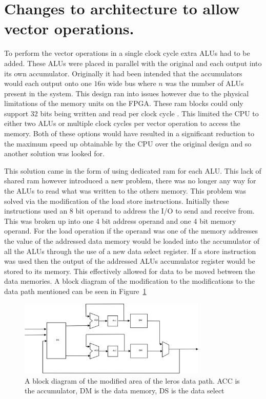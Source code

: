 \section{Changes to architecture to allow vector operations.}

To perform the vector operations in a single clock cycle extra ALUs had to be added. These ALUs were placed in parallel with the original and each output into its own accumulator. Originally it had been intended that the accumulators would each output onto one $16n$ wide bus where $n$ was the number of ALUs present in the system. This design ran into issues however due to the physical limitations of the memory units on the FPGA. These ram blocks could only support 32 bits being written and read per clock cycle \cite{spartan_ram}. This limited the CPU to either two ALUs or multiple clock cycles per vector operation to access the memory. Both of these options would have resulted in a significant reduction to the maximum speed up obtainable by the CPU over the original design and so another solution was looked for.

This solution came in the form of using dedicated ram for each ALU. This lack of shared ram however introduced a new problem, there was no longer any way for the ALUs to read what was written to the others memory. This problem was solved via the modification of the load store instructions. Initially these instructions used an 8 bit operand to address the I/O to send and receive from. This was broken up into one 4 bit address operand and one 4 bit memory operand. For the load operation if the operand was one of the memory addresses the value of the addressed data memory would be loaded into the accumulator of all the ALUs through the use of a new data select register. If a store instruction was used then the output of the addressed ALUs accumulator register would be stored to its memory. This effectively allowed for data to be moved between the data memories. A block diagram of the modification to the modifications to the data path mentioned can be seen in Figure~\ref{new_path}

\begin{figure}[ht]
	\begin{center}
		\includegraphics[width=0.8\textwidth]{images/new_path}
	\end{center}
	\caption{A block diagram of the modified area of the leros data path. ACC is the accumulator, DM is the data memory, DS is the data select}
	\label{new_path}
\end{figure}

